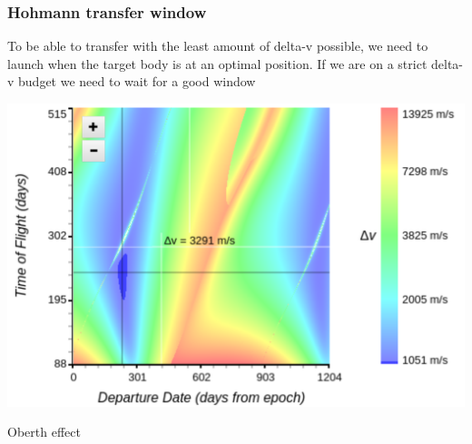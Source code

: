 \begin{frame}
    \frametitle{Hohmann transfer window}
    \begin{block}{}
        To be able to transfer with the least amount of delta-v possible, we need to launch when the target body is
        at an optimal position. If we are on a strict delta-v budget we need to wait for a good window
    \end{block}
    \begin{block}{}
        \begin{center}
            \includegraphics[scale=0.08]{images/hohmann_transfer_window}
        \end{center}
    \end{block}
\end{frame}
{
%
\begin{frame}[t]{Oberth effect}
\end{frame}
}
